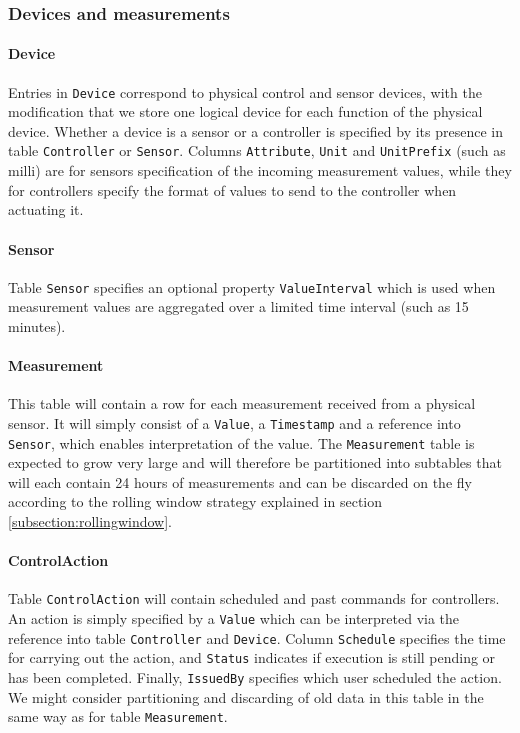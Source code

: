 \subsubsection{Devices and measurements}

\paragraph{Device} 
Entries in \texttt{Device} correspond to physical control and sensor devices, with the modification that we store one logical device for each function of the physical device. Whether a device is a sensor or a controller is specified by its presence in table \texttt{Controller} or \texttt{Sensor}. Columns \texttt{Attribute}, \texttt{Unit} and \texttt{UnitPrefix} (such as milli) are for sensors specification of the incoming measurement values, while they for controllers specify the format of values to send to the controller when actuating it.

\paragraph{Sensor} 
Table \texttt{Sensor} specifies an optional property \texttt{ValueInterval} which is used when measurement values are aggregated over a limited time interval (such as 15 minutes). 

\paragraph{Measurement} 
This table will contain a row for each measurement received from a physical sensor. It will simply consist of a \texttt{Value}, a \texttt{Timestamp} and a reference into \texttt{Sensor}, which enables interpretation of the value. The \texttt{Measurement} table is expected to grow very large and will therefore be partitioned into subtables that will each contain 24 hours of measurements and can be discarded on the fly according to the rolling window strategy explained in section \ref{subsection:rollingwindow}.

\paragraph{ControlAction} 
Table \texttt{ControlAction} will contain scheduled and past commands for controllers. An action is simply specified by a \texttt{Value} which can be interpreted via the reference into table \texttt{Controller} and \texttt{Device}. Column \texttt{Schedule} specifies the time for carrying out the action, and \texttt{Status} indicates if execution is still pending or has been completed. Finally, \texttt{IssuedBy} specifies which user scheduled the action. We might consider partitioning and discarding of old data in this table in the same way as for table \texttt{Measurement}.

